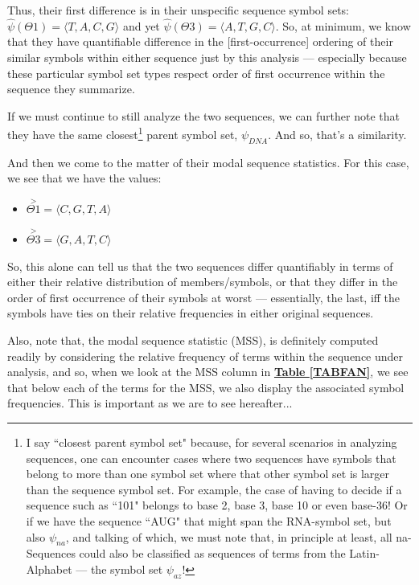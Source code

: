 \documentclass[a4paper, 18pt]{book} %
\begin{document}
Thus, their first difference is in their unspecific sequence symbol sets: $\hat{\psi}(\Theta1) = \langle T, A, C, G\rangle$ and yet $\hat{\psi}(\Theta3) = \langle A, T, G, C\rangle$. So, at minimum, we know that they have quantifiable difference in the [first-occurrence] ordering of their similar symbols within either sequence just by this analysis --- especially because these particular symbol set types respect order of first occurrence within the sequence they summarize.

If we must continue to still analyze the two sequences, we can further note that they have the same closest\footnote{I say ``closest parent symbol set" because, for several scenarios in analyzing sequences, one can encounter cases where two sequences have symbols that belong to more than one symbol set where that other symbol set is larger than the sequence symbol set. For example, the case of having to decide if a sequence such as ``101" belongs to base 2, base 3, base 10 or even base-36! Or if we have the sequence ``AUG" that might span the RNA-symbol set, but also $\psi_{na}$, and talking of which, we must note that, in principle at least, all na-Sequences could also be classified as sequences of terms from the Latin-Alphabet --- the symbol set $\psi_{az}$!} parent symbol set, $\psi_{DNA}$. And so, that's a similarity.

And then we come to the matter of their modal sequence statistics. For this case, we see that we have the values: 

\begin{itemize}
\item $\overset{>}{\Theta1} = \langle C, G, T, A \rangle$
\item $\overset{>}{\Theta3} = \langle G, A, T, C \rangle$
\end{itemize}

So, this alone can tell us that the two sequences differ quantifiably in terms of either their relative distribution of members/symbols, or that they differ in the order of first occurrence of their symbols at worst --- essentially, the last, iff the symbols have ties on their relative frequencies in either original sequences.

Also, note that, the modal sequence statistic (MSS), is definitely computed readily by considering the relative frequency of terms within the sequence under analysis, and so, when we look at the MSS column in \textbf{\hyperref[TABFAN]{Table \ref{TABFAN}}}, we see that below each of the terms for the MSS, we also display the associated symbol frequencies. This is important as we are to see hereafter...
\end{document}
